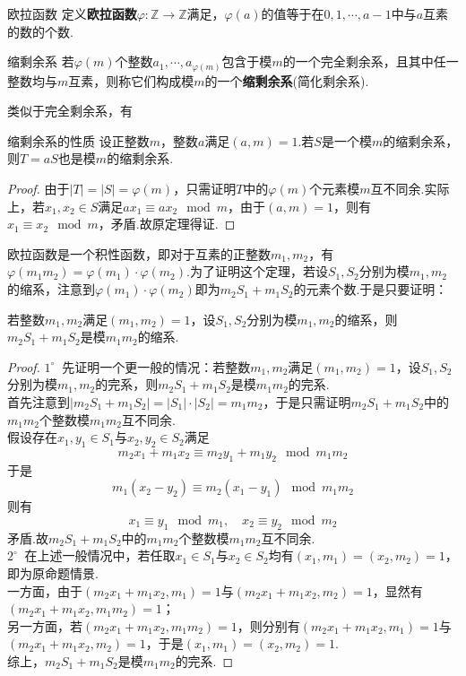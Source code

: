 \documentclass[lang=cn, zihao=5]{elegantbook}
\newcommand{\buzhou}[1]{$#1^{\circ} \ $}
\begin{document}
\begin{definition}{欧拉函数}
	定义\textbf{欧拉函数}$\varphi :\mathbb{Z} \to \mathbb{Z}$满足，$\varphi (a)$的值等于在$0,1,\cdots ,a-1$中与$a$互素的数的个数.
\end{definition}

\begin{definition}{缩剩余系}
	若$\varphi (m)$个整数$a_1,\cdots ,a_{\varphi (m)}$包含于模$m$的一个完全剩余系，且其中任一整数均与$m$互素，则称它们构成模$m$的一个\textbf{缩剩余系}(简化剩余系).
\end{definition}

类似于完全剩余系，有

\begin{theorem}{缩剩余系的性质}
	设正整数$m$，整数$a$满足$(a,m)=1$.若$S$是一个模$m$的缩剩余系，则$T=aS$也是模$m$的缩剩余系.
\end{theorem}
\begin{proof}
	由于$|T|=|S|=\varphi (m)$，只需证明$T$中的$\varphi (m)$个元素模$m$互不同余.实际上，若$x_1,x_2 \in S$满足$ax_1 \equiv ax_2 \mod m$，由于$(a,m)=1$，则有$x_1 \equiv x_2 \mod m$，矛盾.故原定理得证.
\end{proof}

欧拉函数是一个积性函数，即对于互素的正整数$m_1,m_2$，有$\varphi (m_1m_2) = \varphi (m_1) \cdot \varphi (m_2)$.为了证明这个定理，若设$S_1,S_2$分别为模$m_1,m_2$的缩系，注意到$\varphi (m_1) \cdot \varphi (m_2)$即为$m_2S_1+m_1S_2$的元素个数.于是只要证明：

\begin{theorem}
	若整数$m_1,m_2$满足$(m_1,m_2)=1$，设$S_1,S_2$分别为模$m_1,m_2$的缩系，则$m_2S_1+m_1S_2$是模$m_1m_2$的缩系.
\end{theorem}
\begin{proof}
	\buzhou{1} 先证明一个更一般的情况：若整数$m_1,m_2$满足$(m_1,m_2)=1$，设$S_1,S_2$分别为模$m_1,m_2$的完系，则$m_2S_1+m_1S_2$是模$m_1m_2$的完系. \\
	首先注意到$|m_2S_1+m_1S_2|=|S_1| \cdot |S_2|=m_1m_2$，于是只需证明$m_2S_1+m_1S_2$中的$m_1m_2$个整数模$m_1m_2$互不同余. \\
	假设存在$x_1,y_1 \in S_1$与$x_2,y_2 \in S_2$满足$$m_2x_1 + m_1x_2 \equiv m_2y_1 + m_1y_2 \mod m_1m_2$$
	于是$$m_1(x_2-y_2) \equiv m_2(x_1-y_1) \mod m_1m_2$$
	则有$$x_1 \equiv y_1 \mod m_1,\quad x_2 \equiv y_2 \mod m_2$$
	矛盾.故$m_2S_1+m_1S_2$中的$m_1m_2$个整数模$m_1m_2$互不同余. \\
	\buzhou{2} 在上述一般情况中，若任取$x_1 \in S_1$与$x_2 \in S_2$均有$(x_1,m_1)=(x_2,m_2)=1$，即为原命题情景. \\
	一方面，由于$(m_2x_1+m_1x_2,m_1)=1$与$(m_2x_1+m_1x_2,m_2)=1$，显然有$(m_2x_1+m_1x_2,m_1m_2)=1$； \\
	另一方面，若$(m_2x_1+m_1x_2,m_1m_2)=1$，则分别有$(m_2x_1+m_1x_2,m_1)=1$与$(m_2x_1+m_1x_2,m_2)=1$，于是$(x_1,m_1)=(x_2,m_2)=1$. \\
	综上，$m_2S_1+m_1S_2$是模$m_1m_2$的完系.
\end{proof}
\end{document}
